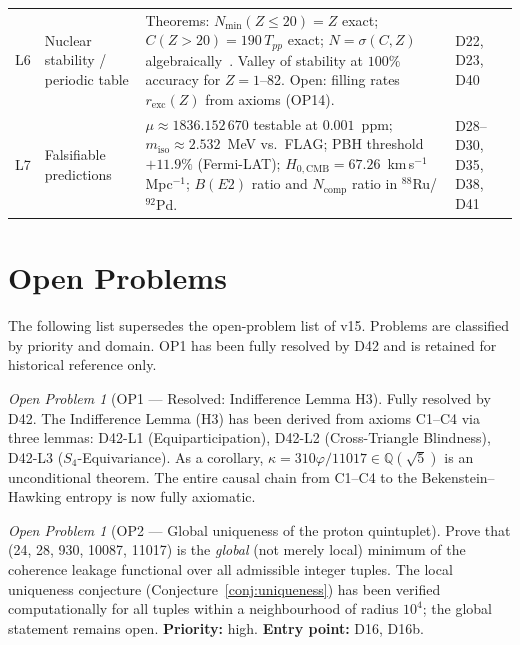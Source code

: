 \documentclass[11pt,a4paper]{article}
\theoremstyle{plain}
\theoremstyle{definition}
\theoremstyle{remark}
\newtheorem{openproblem}[theorem]{Open Problem}
\newcommand{\Tpp}{T_{pp}}
\begin{document}
\begin{longtable}{L{0.6cm}L{3.0cm}L{5.5cm}L{4.0cm}}
L6 & Nuclear stability / periodic table & \textcolor{proofblue}{Theorems}: $N_{\min}(Z\leq20)=Z$ exact; $C(Z>20)=190\,\Tpp$ exact; $N=\sigma(C,Z)$ algebraically~\cite{D40}. Valley of stability at $100\%$ accuracy for $Z=1$--82. \textcolor{openproblemred}{Open}: filling rates $r_{\mathrm{exc}}(Z)$ from axioms (OP14). & D22, D23, D40\\[0.4em]
L7 & Falsifiable predictions & $\mu\approx 1836.152\,670$ testable at $0.001$~ppm; $m_{\mathrm{iso}}\approx 2.532$~MeV vs.\ FLAG; PBH threshold $+11.9\%$ (Fermi-LAT); $H_{0,\mathrm{CMB}}=67.26$~km\,s$^{-1}$\,Mpc$^{-1}$; $B(E2)$ ratio and $N_{\mathrm{comp}}$ ratio in $^{88}$Ru/$^{92}$Pd. & D28--D30, D35, D38, D41\\
\end{longtable}

\section{Open Problems}
\label{sec:openproblems}

The following list supersedes the open-problem list of v15. Problems are classified by priority and domain. OP1 has been fully resolved by D42 and is retained for historical reference only.

\begin{openproblem}[OP1 --- Resolved: Indifference Lemma H3]
\label{op:H3}
\textcolor{proofblue}{Fully resolved by D42.} The Indifference Lemma (H3) has been derived from axioms C1--C4 via three lemmas: D42-L1 (Equiparticipation), D42-L2 (Cross-Triangle Blindness), D42-L3 ($S_4$-Equivariance). As a corollary, $\kappa=310\varphi/11017\in\mathbb{Q}(\sqrt{5})$ is an unconditional theorem. The entire causal chain from C1--C4 to the Bekenstein--Hawking entropy is now fully axiomatic.
\end{openproblem}

\begin{openproblem}[OP2 --- Global uniqueness of the proton quintuplet]
\label{op:uniqueness} Prove that (24, 28, 930, 10087, 11017) is the \emph{global} (not merely local) minimum of the coherence leakage functional over all admissible integer tuples. The local uniqueness conjecture (Conjecture~\ref{conj:uniqueness}) has been verified computationally for all tuples within a neighbourhood of radius $10^4$; the global statement remains open. \textbf{Priority:} high. \textbf{Entry point:} D16, D16b.
\end{openproblem}
\end{document}
